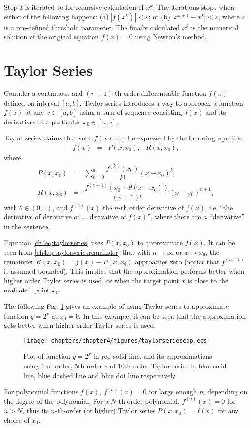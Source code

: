 Step 3 is iterated to for recursive calculation of $x^{k}$. The iterations stops when either of the following happens: (a) $|f(x^k)| < \varepsilon$; or (b) $|x^{k+1}-x^k|<\varepsilon$, where $\varepsilon$ is a pre-defined threshold parameter. The finally calculated $x^k$ is the numerical solution of the original equation $f(x)=0$ using Newton's method.

\section{Taylor Series} \label{ch4sec:taylorseries}

Consider a continuous and $(n+1)$-th order differentiable function $f(x)$ defined on interval $[a, b]$. Taylor series introduces a way to approach a function $f(x)$ at any $x \in [a, b]$ using a sum of sequence consisting $f(x)$ and its derivatives at a particular $x_0 \in [a, b]$.

Taylor series claims that such $f(x)$ can be expressed by the following equation
\begin{eqnarray}
    f(x) &=& P(x,x_0), + R(x,x_0), \label{ch4eq:taylorseries}
\end{eqnarray}
where
\begin{eqnarray}
    P(x,x_0) &=& \sum_{k=0}^n \dfrac{f^{(k)}(x_0)}{k!}(x-x_0)^k, \nonumber \\
    R(x,x_0) &=& \dfrac{f^{(n+1)}\left(x_0 + \theta(x-x_0)\right)}{(n+1)!}(x-x_0)^{n+1}, \label{ch4eq:taylorseriesremainder}
\end{eqnarray}
with $\theta \in (0,1)$, and $f^{(n)}(x)$ the $n$-th order derivative of $f(x)$, i.e. ``the derivative of derivative of ... derivative of $f(x)$'', where there are $n$ ``derivative'' in the sentence.

Equation \eqref{ch4eq:taylorseries} uses $P(x,x_0)$ to approximate $f(x)$. It can be seen from \eqref{ch4eq:taylorseriesremainder} that with $n\rightarrow \infty$ or $x \rightarrow x_0$, the remainder $R(x,x_0) = f(x) - P(x,x_0)$ approaches zero (notice that $f^{(n+1)}$ is assumed bounded). This implies that the approximation performs better when higher order Taylor series is used, or when the target point $x$ is close to the evaluated point $x_0$.

The following Fig. \ref{ch4fig:taylordemo} gives an example of using Taylor series to approximate function $y=2^x$ at $x_0=0$. In this example, it can be seen that the approximation gets better when higher order Taylor series is used.
\begin{figure}
\centering
\texttt{[image: chapters/chapter4/figures/taylorseriesexp.eps]}
\caption{Plot of function $y=2^x$ in red solid line, and its approximations using first-order, $5$th-order and $10$th-order Taylor series in blue solid line, blue dashed line and blue dot line respectively.} \label{ch4fig:taylordemo}
\end{figure}

For polynomial functions $f(x)$, $f^{(n)}(x) = 0$ for large enough $n$, depending on the degree of the polynomial. For a $N$-th-order polynomial, $f^{(n)}(x) = 0$ for $n>N$, thus its $n$-th-order (or higher) Taylor series $P(x,x_0)=f(x)$ for any choice of $x_0$.
